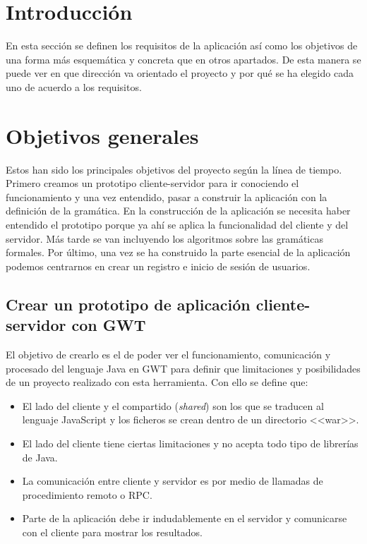 
\section{Introducción}

En esta sección se definen los requisitos de la aplicación así como los objetivos de una forma más esquemática y concreta que en otros apartados. De esta manera se puede ver en que dirección va orientado el proyecto y por qué se ha elegido cada uno de acuerdo a los requisitos.

\section{Objetivos generales}

Estos han sido los principales objetivos del proyecto según la línea de tiempo. Primero creamos un prototipo cliente-servidor para ir conociendo el funcionamiento y una vez entendido, pasar a construir la aplicación con la definición de la gramática. En la construcción de la aplicación se necesita haber entendido el prototipo porque ya ahí se aplica la funcionalidad del cliente y del servidor. Más tarde se van incluyendo los algoritmos sobre las gramáticas formales. Por último, una vez se ha construido la parte esencial de la aplicación podemos centrarnos en crear un registro e inicio de sesión de usuarios.

\subsection{Crear un prototipo de aplicación cliente-servidor con GWT}

El objetivo de crearlo es el de poder ver el funcionamiento, comunicación y procesado del lenguaje Java en GWT para definir que limitaciones y posibilidades de un proyecto realizado con esta herramienta. Con ello se define que:  
\begin{itemize}
\item El lado del cliente y el compartido (\emph{shared}) son los que se traducen al lenguaje JavaScript y los ficheros se crean dentro de un directorio <<war>>.
\item El lado del cliente tiene ciertas limitaciones y no acepta todo tipo de librerías de Java. 
\item La comunicación entre cliente y servidor es por medio de llamadas de procedimiento remoto o RPC.
\item Parte de la aplicación debe ir indudablemente en el servidor y comunicarse con el cliente para mostrar los resultados.
\end{itemize}

